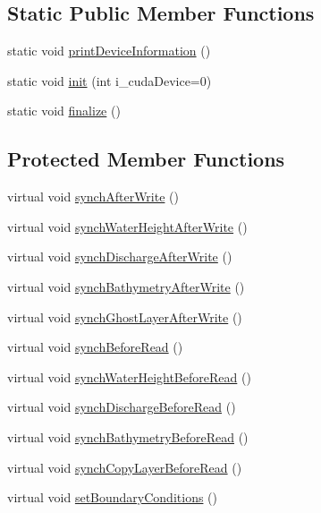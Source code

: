 \subsection*{Static Public Member Functions}
\begin{DoxyCompactItemize}
\item 
static void \hyperlink{classSWE__BlockCUDA_a73fceb94ac9c5ffc4164720967b06143}{print\-Device\-Information} ()
\item 
static void \hyperlink{classSWE__BlockCUDA_ad5143c0c87c6e28f84d446e3f93c0ec1}{init} (int i\-\_\-cuda\-Device=0)
\item 
static void \hyperlink{classSWE__BlockCUDA_a1d77f5dc1168bf11d1b10a92bcefa4ac}{finalize} ()
\end{DoxyCompactItemize}
\subsection*{Protected Member Functions}
\begin{DoxyCompactItemize}
\item 
virtual void \hyperlink{classSWE__BlockCUDA_a0876ef53f667c142d7d4dd9d01cfd2dc}{synch\-After\-Write} ()
\item 
virtual void \hyperlink{classSWE__BlockCUDA_ae54054af51e68415a68f3a1c7b25c139}{synch\-Water\-Height\-After\-Write} ()
\item 
virtual void \hyperlink{classSWE__BlockCUDA_a71b1d0b2e6959c298dfccf6a36264e13}{synch\-Discharge\-After\-Write} ()
\item 
virtual void \hyperlink{classSWE__BlockCUDA_aef79c805fec82b4d439642a758a8e95f}{synch\-Bathymetry\-After\-Write} ()
\item 
virtual void \hyperlink{classSWE__BlockCUDA_ab9cc911c9d67bcab9ecb2818a056930b}{synch\-Ghost\-Layer\-After\-Write} ()
\item 
virtual void \hyperlink{classSWE__BlockCUDA_a9ba846c6fa27734412d9fdfaa3823de2}{synch\-Before\-Read} ()
\item 
virtual void \hyperlink{classSWE__BlockCUDA_adfd3185b108632b2506558063714d7df}{synch\-Water\-Height\-Before\-Read} ()
\item 
virtual void \hyperlink{classSWE__BlockCUDA_adea7daf7794147d73d9465d37b37055e}{synch\-Discharge\-Before\-Read} ()
\item 
virtual void \hyperlink{classSWE__BlockCUDA_a3edd34c86eb0837d09f24cbf56a16e69}{synch\-Bathymetry\-Before\-Read} ()
\item 
virtual void \hyperlink{classSWE__BlockCUDA_a41d117ca8fe9a8c5509369edd026fd63}{synch\-Copy\-Layer\-Before\-Read} ()
\item 
virtual void \hyperlink{classSWE__BlockCUDA_a7cf66067cb7f023aadbd910051d389c8}{set\-Boundary\-Conditions} ()
\end{DoxyCompactItemize}

